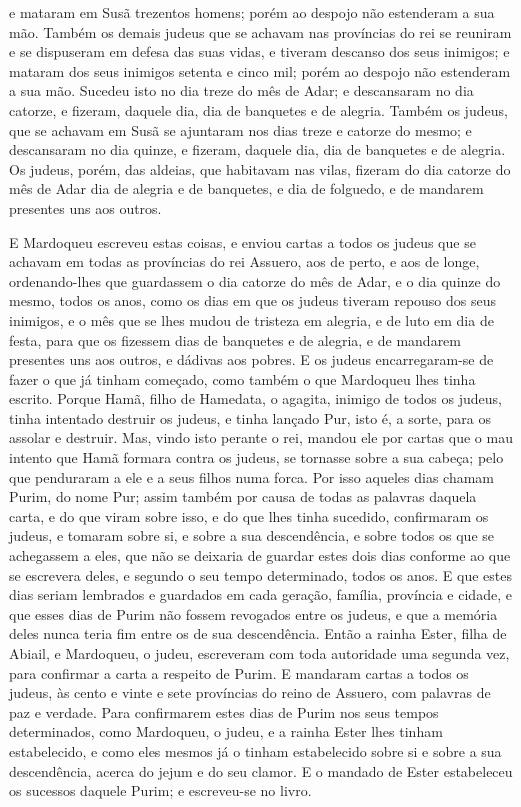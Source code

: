 e mataram em Susã trezentos homens; porém ao despojo não estenderam
a sua mão. Também os demais judeus que se achavam nas
províncias do rei se reuniram e se dispuseram em defesa das suas
vidas, e tiveram descanso dos seus inimigos; e mataram dos seus
inimigos setenta e cinco mil; porém ao despojo não estenderam a sua
mão. Sucedeu isto no dia treze do mês de Adar; e descansaram
no dia catorze, e fizeram, daquele dia, dia de banquetes e de
alegria. Também os judeus, que se achavam em Susã se
ajuntaram nos dias treze e catorze do mesmo; e descansaram no dia
quinze, e fizeram, daquele dia, dia de banquetes e de alegria.
Os judeus, porém, das aldeias, que habitavam nas vilas,
fizeram do dia catorze do mês de Adar dia de alegria e de banquetes,
e dia de folguedo, e de mandarem presentes uns aos outros.

E Mardoqueu escreveu estas coisas, e enviou cartas a todos os
judeus que se achavam em todas as províncias do rei Assuero, aos de
perto, e aos de longe, ordenando-lhes que guardassem o dia
catorze do mês de Adar, e o dia quinze do mesmo, todos os anos,
como os dias em que os judeus tiveram repouso dos seus
inimigos, e o mês que se lhes mudou de tristeza em alegria, e de
luto em dia de festa, para que os fizessem dias de banquetes e de
alegria, e de mandarem presentes uns aos outros, e dádivas aos
pobres. E os judeus encarregaram-se de fazer o que já tinham
começado, como também o que Mardoqueu lhes tinha escrito.
Porque Hamã, filho de Hamedata, o agagita, inimigo de todos
os judeus, tinha intentado destruir os judeus, e tinha lançado Pur,
isto é, a sorte, para os assolar e destruir. Mas, vindo isto
perante o rei, mandou ele por cartas que o mau intento que Hamã
formara contra os judeus, se tornasse sobre a sua cabeça; pelo que
penduraram a ele e a seus filhos numa forca. Por isso aqueles
dias chamam Purim, do nome Pur; assim também por causa de todas as
palavras daquela carta, e do que viram sobre isso, e do que lhes
tinha sucedido, confirmaram os judeus, e tomaram sobre si, e
sobre a sua descendência, e sobre todos os que se achegassem a eles,
que não se deixaria de guardar estes dois dias conforme ao que se
escrevera deles, e segundo o seu tempo determinado, todos os anos.
E que estes dias seriam lembrados e guardados em cada
geração, família, província e cidade, e que esses dias de Purim não
fossem revogados entre os judeus, e que a memória deles nunca teria
fim entre os de sua descendência. Então a rainha Ester, filha
de Abiail, e Mardoqueu, o judeu, escreveram com toda autoridade uma
segunda vez, para confirmar a carta a respeito de Purim. E
mandaram cartas a todos os judeus, às cento e vinte e sete
províncias do reino de Assuero, com palavras de paz e verdade.
Para confirmarem estes dias de Purim nos seus tempos
determinados, como Mardoqueu, o judeu, e a rainha Ester lhes tinham
estabelecido, e como eles mesmos já o tinham estabelecido sobre si e
sobre a sua descendência, acerca do jejum e do seu clamor. E
o mandado de Ester estabeleceu os sucessos daquele Purim; e
escreveu-se no livro.

